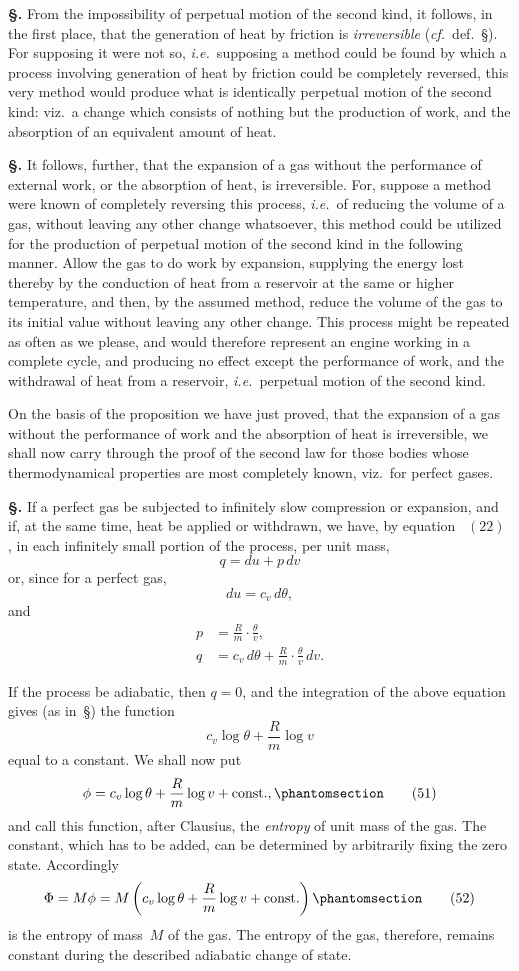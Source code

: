 \documentclass[12pt]{book}[2005/09/16]
\newcommand{\Erratum}[2]{#2}
\newcommand{\Section}[1]{
  \medskip\par\textbf{§\;#1}
  \label{section:#1}
}
\newcommand{\SecRef}[2][§\;]{\hyperref[section:#2.]{{\upshape #1#2}}}
\newcommand{\Tag}[1]{%
  \phantomsection\label{eqn:#1}\tag*{\ensuremath{#1}}%
}
\newcommand{\Eq}[1]{%
  \hyperref[eqn:#1]{\ensuremath{#1}}%
}
\newcommand{\PageSep}[1]{\ignorespaces}
\newcommand{\const}{\text{const.}}
\newcommand{\ie}{\emph{i.e.}}
\renewcommand{\cf}{\emph{cf.}}
\begin{document}
\Section{117.} From the impossibility of perpetual motion of
the second kind, it follows, in the first place, that the
generation of heat by friction is \emph{irreversible} (\cf\ def.~\SecRef{112}).
For supposing it were not so, \ie\ supposing a method could
be found by which a process involving generation of heat
by friction could be completely reversed, this very method
would produce what is identically perpetual motion of the
second kind: viz.\ a change which consists of nothing but
the production of work, and the absorption of an equivalent
amount of heat.

\Section{118.} It follows, further, that the expansion of a gas
without the performance of external \Erratum{heat}{work}, or the absorption
of heat, is irreversible. For, suppose a method were known
of completely reversing this process, \ie\ of reducing the
volume of a gas, without leaving any other change whatsoever,
this method could be utilized for the production of
perpetual motion of the second kind in the following manner.
Allow the gas to do work by expansion, supplying the energy
\PageSep{88}
lost thereby by the conduction of heat from a reservoir at
the same or higher temperature, and then, by the assumed
method, reduce the volume of the gas to its initial value
without leaving any other change. This process might be
repeated as often as we please, and would therefore represent
an engine working in a complete cycle, and producing no
effect except the performance of work, and the withdrawal
of heat from a reservoir, \ie\ perpetual motion of the second
kind.

On the basis of the proposition we have just proved, that
the expansion of a gas without the performance of work
and the absorption of heat is irreversible, we shall now carry
through the proof of the second law for those bodies whose
thermodynamical properties are most completely known,
viz.\ for perfect gases.

\Section{119.} If a perfect gas be subjected to infinitely slow
compression or expansion, and if, at the same time, heat be
applied or withdrawn, we have, by equation~\Eq{(22)}, in each
infinitely small portion of the process, per unit mass,
\[
q = du + p\, dv
\]
or, since for a perfect gas,
\[
du = c_{v}\, d\theta,
\]
and
\begin{align*}
p &= \frac{R}{m} · \frac{\theta}{v}, \\
q &= c_{v}\, d\theta + \frac{R}{m} · \frac{\theta}{v}\, dv.
\end{align*}

If the process be adiabatic, then $q = 0$, and the integration
of the above equation gives (as in~\SecRef{88}) the function
\[
c_{v} \log \theta + \frac{R}{m} \log v
\]
equal to a constant. We shall now put
\[
\phi = c_{v} \log \theta + \frac{R}{m} \log v + \const,
\Tag{(51)}
\]
\PageSep{89}
and call this function, after Clausius, the \emph{entropy} of unit mass
%
of the gas. The constant, which has to be added, can be
determined by arbitrarily fixing the zero state. Accordingly
\[
\Phi = M\phi = M \left(c_{v} \log \theta + \frac{R}{m} \log v + \const\right)
\Tag{(52)}
\]
is the entropy of mass~$M$ of the gas. The entropy of the
gas, therefore, remains constant during the described
adiabatic change of state.
\end{document}
